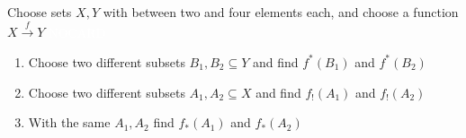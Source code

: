 
Choose sets $X,Y$ with between two and four elements each, and choose a function $X \xrightarrow{f} Y$  \textcolor{white}{NOCARD}
    \begin{enumerate}
      \item Choose two different subsets $B_1, B_2 \subseteq Y$ and find $f^*(B_1)$ and $f^*(B_2)$
      \item Choose two different subsets $A_1, A_2 \subseteq X$ and find $f_!(A_1)$ and $f_!(A_2)$
      \item With the same $A_1, A_2$ find $f_*(A_1)$ and $f_*(A_2)$
    \end{enumerate}